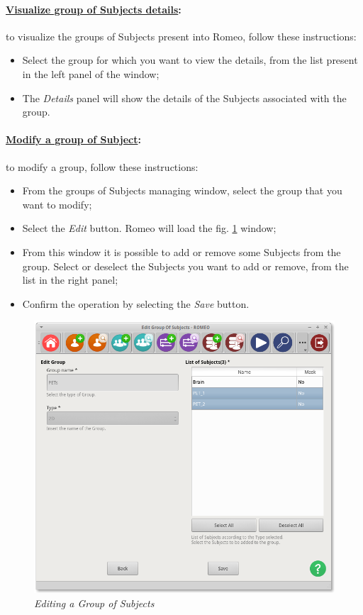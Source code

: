 \paragraph{\underline{Visualize group of Subjects details}:} to visualize the groups of Subjects\g{} present into Romeo, follow these instructions:
\begin{itemize}
\item Select the group for which you want to view the details, from the list present in the left panel of the window;
\item The \textit{Details} panel will show the details of the Subjects\g{} associated with the group.
\end{itemize}

\paragraph{\underline{Modify a group of Subject}:} to modify a group, follow these instructions:
\begin{itemize}
\item From the groups of Subjects\g{} managing window, select the group that you want to modify;
\item Select the \textit{Edit} button. Romeo will load the fig. \ref{editgroup} window;
\item From this window it is possible to add or remove some Subjects\g{} from the group. Select or deselect the Subjects\g{} you want to add or remove, from the list in the right panel;
\item Confirm the operation by selecting the \textit{Save} button.
\end{itemize}
\begin{figure}[!h]
\begin{center}
\includegraphics[scale=0.4]{./Images/ManageGroups}
\caption{\textit{Editing a Group of Subjects}}
\label{editgroup}
\end{center}
\end{figure}
\pagebreak

